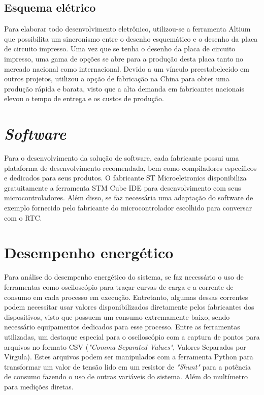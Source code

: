 \subsection{Esquema elétrico}
Para elaborar todo desenvolvimento eletrônico, utilizou-se a ferramenta Altium que possibilita um sincronismo entre o desenho esquemático e o desenho da placa de circuito impresso. Uma vez que se tenha o desenho da placa de circuito impresso, uma gama de opções se abre para a produção desta placa tanto no mercado nacional como internacional. Devido a um vínculo preestabelecido em outros projetos, utilizou a opção de fabricação na China para obter uma produção rápida e barata, visto que a alta demanda em fabricantes nacionais elevou o tempo de entrega e os custos de produção.
\section{\textit{Software}}
Para o desenvolvimento da solução de software, cada fabricante possui uma plataforma de desenvolvimento recomendada, bem como compiladores específicos e dedicados para seus produtos. O fabricante ST Microeletronics disponibiliza gratuitamente a ferramenta STM Cube IDE  para desenvolvimento com seus microcontroladores.
Além disso, se faz necessária uma adaptação do software de exemplo fornecido pelo fabricante do microcontrolador escolhido para conversar com o RTC. 
\section{Desempenho energético}
Para análise do desempenho energético do sistema, se faz necessário o uso de ferramentas como osciloscópio para traçar curvas de carga e a corrente de consumo em cada processo em execução. Entretanto, algumas dessas correntes podem necessitar usar valores disponibilizados diretamente pelos fabricantes dos dispositivos, visto que possuem um consumo extremamente baixo, sendo necessário equipamentos dedicados para esse processo. Entre as ferramentas utilizadas, um destaque especial para o osciloscópio com a captura de pontos para arquivos no formato CSV (\textit{"Comma Separated Values"}, Valores Separados por Vírgula). Estes arquivos podem ser manipulados com a ferramenta Python para transformar um valor de tensão lido em um resistor de \textit{"Shunt"} para a potência de consumo fazendo o uso de outras variáveis do sistema. Além do multímetro para medições diretas.

